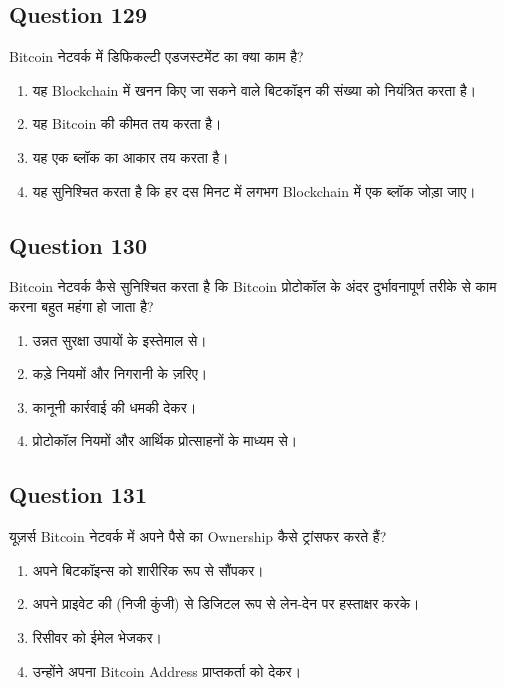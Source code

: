 \documentclass[12pt,a4paper]{article}
\begin{document}
\bigskip


\subsection*{Question 129}
Bitcoin नेटवर्क में डिफिकल्टी एडजस्टमेंट का क्या काम है?

\begin{enumerate}[label=\Alph*., leftmargin=*]
\item यह Blockchain में खनन किए जा सकने वाले बिटकॉइन की संख्या को नियंत्रित करता है।
\item यह Bitcoin की कीमत तय करता है।
\item यह एक ब्लॉक का आकार तय करता है।
\item यह सुनिश्चित करता है कि हर दस मिनट में लगभग Blockchain में एक ब्लॉक जोड़ा जाए।
\end{enumerate}

\bigskip


\subsection*{Question 130}
Bitcoin नेटवर्क कैसे सुनिश्चित करता है कि Bitcoin प्रोटोकॉल के अंदर दुर्भावनापूर्ण तरीके से काम करना बहुत महंगा हो जाता है?

\begin{enumerate}[label=\Alph*., leftmargin=*]
\item उन्नत सुरक्षा उपायों के इस्तेमाल से।
\item कड़े नियमों और निगरानी के ज़रिए।
\item कानूनी कार्रवाई की धमकी देकर।
\item प्रोटोकॉल नियमों और आर्थिक प्रोत्साहनों के माध्यम से।
\end{enumerate}

\bigskip


\subsection*{Question 131}
यूज़र्स Bitcoin नेटवर्क में अपने पैसे का Ownership कैसे ट्रांसफर करते हैं?

\begin{enumerate}[label=\Alph*., leftmargin=*]
\item अपने बिटकॉइन्स को शारीरिक रूप से सौंपकर।
\item अपने प्राइवेट की (निजी कुंजी) से डिजिटल रूप से लेन-देन पर हस्ताक्षर करके।
\item रिसीवर को ईमेल भेजकर।
\item उन्होंने अपना Bitcoin Address प्राप्तकर्ता को देकर।
\end{enumerate}
\end{document}
